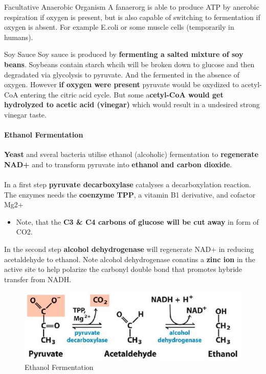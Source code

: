 \documentclass[../main.tex]{subfiles}
\begin{document}
\begin{DefWithTitle}{Facultative Anaerobic Organism}
	A \gls{fanaerorg} is able to produce ATP by anerobic respiration if oxygen is present, but is also capable of switching to fermentation if oxygen is absent. For example E.coli or some muscle cells (temporarily in humans). 
\end{DefWithTitle}

\begin{RemarkWithTitel}{Soy Sauce}
	Soy sauce is produced by \textbf{fermenting a salted mixture of soy beans}. Soybeans contain starch whcih will be broken down to glucose and then degradated via glycolysis to pyruvate. And the fermented in the absence of oxygen. However \textbf{if oxygen were present} pyruvate would be oxydized to acetyl-CoA entering the citric acid cycle. But some a\textbf{cetyl-CoA would get hydrolyzed to acetic acid (vinegar)} which would result in a undesired strong vinegar taste.
\end{RemarkWithTitel}

\paragraph{Ethanol Fermentation}
\textbf{Yeast} and sveral bacteria utilise ethanol (alcoholic) fermentation to \textbf{regenerate NAD+} and to transform pyruvate into \textbf{ethanol and carbon dioxide}.\\
\\
In a first step \textbf{pyruvate decarboxylase} catalyses a decarboxylation reaction. The enzymes needs the\textbf{ coenzyme TPP}, a vitamin B1 derivative, and cofactor Mg2+ 
\begin{itemize}
	\item Note, that the \textbf{C3 \& C4 carbons of glucose will be cut away} in form of CO2. 
\end{itemize}
In the second step \textbf{alcohol dehydrogenase} will regenerate NAD+ in reducing acetaldehyde to ethanol. Note alcohol dehydrogenase conatins a \textbf{zinc ion} in the active site to help polarize the carbonyl double bond that promotes hybride transfer from NADH. 

\begin{figure}[H]
	\centering
	\includegraphics[width = 0.6 \textwidth]{ethanol}
	\caption{Ethanol Fermentation}
\end{figure}
\end{document}
